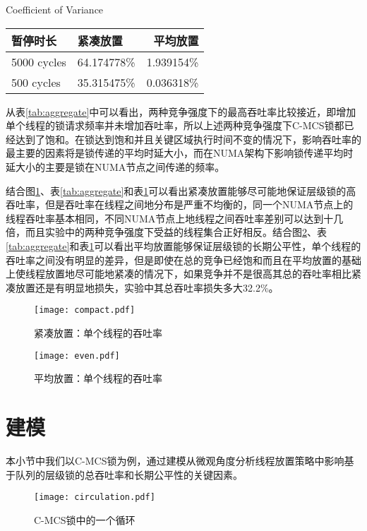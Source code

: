 \begin{table}[!hpb]
  \centering
    {Coefficient of Variance}
  \label{tab:CV}
  \begin{tabular}{@{}llr@{}} \toprule
    暂停时长 & 紧凑放置 & 平均放置\\ \midrule
    5000 cycles & 64.174778\% & 1.939154\%\\
    500  cycles & 35.315475\% & 0.036318\%\\
  \end{tabular}
\end{table}

从表\ref{tab:aggregate}中可以看出，两种竞争强度下的最高吞吐率比较接近，即增加单个线程的锁请求频率并未增加吞吐率，所以上述两种竞争强度下C-MCS锁都已经达到了饱和。在锁达到饱和并且关键区域执行时间不变的情况下，影响吞吐率的最主要的因素将是锁传递的平均时延大小，而在NUMA架构下影响锁传递平均时延大小的主要是锁在NUMA节点之间传递的频率。

结合图\ref{Fig:compact}、表\ref{tab:aggregate}和表\ref{tab:CV}可以看出紧凑放置能够尽可能地保证层级锁的高吞吐率，但是吞吐率在线程之间地分布是严重不均衡的，同一个NUMA节点上的线程吞吐率基本相同，不同NUMA节点上地线程之间吞吐率差别可以达到十几倍，而且实验中的两种竞争强度下受益的线程集合正好相反。结合图\ref{Fig:even}、表\ref{tab:aggregate}和表\ref{tab:CV}可以看出平均放置能够保证层级锁的长期公平性，单个线程的吞吐率之间没有明显的差异，但是即使在总的竞争已经饱和而且在平均放置的基础上使线程放置地尽可能地紧凑的情况下，如果竞争并不是很高其总的吞吐率相比紧凑放置还是有明显地损失，实验中其总吞吐率损失多大32.2\%。

\begin{figure}[t]
	\centering
	\texttt{[image: compact.pdf]}
	\caption{紧凑放置：单个线程的吞吐率}
	\label{Fig:compact}
\end{figure}

\begin{figure}[t]
	\centering
	\texttt{[image: even.pdf]}
	\caption{平均放置：单个线程的吞吐率}
	\label{Fig:even}
\end{figure}

\section{建模}
本小节中我们以C-MCS锁为例，通过建模从微观角度分析线程放置策略中影响基于队列的层级锁的总吞吐率和长期公平性的关键因素。

\begin{figure}[t]
	\centering
	\texttt{[image: circulation.pdf]}
	\caption{C-MCS锁中的一个循环}
	\label{Fig:circulation}
\end{figure}

